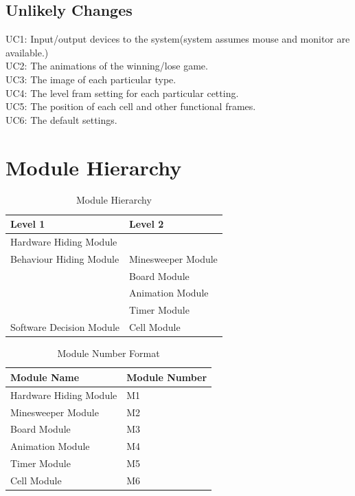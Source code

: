 \documentclass[12pt, titlepage]{article}
\begin{document}
\subsection{Unlikely Changes}
UC1: Input/output devices to the system(system assumes mouse and monitor are available.)\\
UC2: The animations of the winning/lose game.\\
UC3: The image of each particular type.\\
UC4: The level fram setting for each particular cetting.\\
UC5: The position of each cell and other functional frames.\\
UC6: The default settings.\\

\newpage
\section{Module Hierarchy} \label{SecMH}


\begin{table}[!htbp]
        \begin{tabular}{ll}
        \toprule
        Level 1 & Level 2 \\
        \midrule
        Hardware Hiding Module & \\
         \midrule
        Behaviour Hiding Module & Minesweeper Module \\
        & Board Module\\
        &Animation Module\\
        &Timer Module\\
		 \midrule
        Software Decision Module & Cell Module\\
        \bottomrule
        \end{tabular}
        \caption{Module Hierarchy}
        \label{Table 1}
        \end{table}
        
\begin{table}[!htbp]
	\begin{tabular}{ll}
		\toprule
		Module Name & Module Number \\
		\midrule
		Hardware Hiding Module & M1\\
		\midrule
		Minesweeper Module & M2\\
		\midrule
		Board Module & M3\\
		\midrule
		Animation Module & M4\\
		\midrule
		Timer Module & M5\\
		\midrule
		Cell Module & M6\\
		\bottomrule
	\end{tabular}
	\caption{Module Number Format}
	\label{Table 1}
\end{table}
\end{document}
